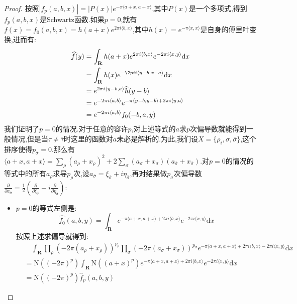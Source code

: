 \begin{enumerate}
\begin{proof}
    	按照$|f_p(a,b,x)|=|P(x)|e^{-\pi\langle a+x,a+x\rangle}$,其中$P(x)$是一个多项式,得到$f_p(a,b,x)$是Schwartz函数.如果$p=0$,就有$f(x)=f_0(a,b,x)=h(a+x)e^{2\pi i\langle b,x\rangle}$,其中$h(x)=e^{-\pi\langle x,x\rangle}$是自身的傅里叶变换,进而有:
    	\begin{align*}
    		\widehat{f}(y)&=\int_{\textbf{R}}h(a+x)e^{2\pi i\langle b,x\rangle}e^{-2\pi i\langle x,y\rangle}\mathrm{d}x\\&=\int_{\textbf{R}}h(x)e^{-\2pi i\langle y-b,x-a\rangle}\mathrm{d}x\\&=e^{2\pi i\langle y-b,a\rangle}\widehat{h}(y-b)\\&=e^{-2\pi i\langle a,b\rangle}e^{-\pi\langle y-b,y-b\rangle+2\pi i\langle y,a\rangle}\\&=e^{-2\pi i\langle a,b\rangle}f_0(-b,a,y)
    	\end{align*}
        我们证明了$p=0$的情况.对于任意的容许$p$,对上述等式的$a$求$p$次偏导数就能得到一般情况,但是当$\tau\not=\overline{\tau}$时这里的函数对$a$未必是解析的.为此,我们设$X=\{\rho_i,\sigma,\overline{\sigma}\}$,这个排序使得$p_{\overline{\sigma}}=0$.那么有$\langle a+x,a+x\rangle=\sum_{\rho}(a_{\rho}+x_{\rho})^2+2\sum_{\sigma}(a_{\sigma}+x_{\sigma})(a_{\overline{\sigma}}+x_{\overline{\sigma}})$.对$p=0$的情况的等式中的所有$a_{\rho}$求导$p_{\rho}$次,设$a_{\overline{\sigma}}=\xi_{\overline{\sigma}}+i\eta_{\overline{\sigma}}$,再对结果做$p_{\sigma}$次偏导数$\frac{\partial}{\partial a_{\overline{\sigma}}}=\frac{1}{2}\left(\frac{\partial}{\partial\xi_{\overline{\sigma}}}-i\frac{\partial}{\partial\eta_{\overline{\sigma}}}\right)$:
        \begin{itemize}
        	\item $p=0$的等式左侧是:
        	$$\widehat{f_0}(a,b,y)=\int_{\textbf{R}}e^{-\pi\langle a+x,a+x\rangle+2\pi i\langle b,x\rangle}e^{-2\pi i\langle x,y\rangle}\mathrm{d}x$$
        	按照上述求偏导就得到:
        	\begin{align*}
        		&\quad\int_{\textbf{R}}\prod_{\rho}\left(-2\pi(a_{\rho}+x_{\rho})\right)^{p_{\rho}}\prod_{\sigma}\left(-2\pi(a_{\sigma}+x_{\sigma})\right)^{p_{\sigma}}e^{-\pi\langle a+x,a+x\rangle+2\pi i\langle b,x\rangle-2\pi i\langle x,y\rangle}\mathrm{d}x\\&=\mathrm{N}\left((-2\pi)^p\right)\int_{\textbf{R}}\mathrm{N}\left((a+x)^p\right)e^{-\pi\langle a+x,a+x\rangle+2\pi i\langle b,x\rangle}e^{-2\pi i\langle x,y\rangle}\mathrm{d}x\\&=\mathrm{N}\left((-2\pi)^p\right)\widehat{f}_p(a,b,y)
        	\end{align*}

\end{itemize}
\end{proof}
\end{enumerate}
